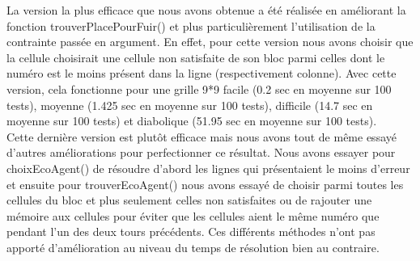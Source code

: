      La version la plus efficace que nous avons obtenue a été réalisée en améliorant la fonction trouverPlacePourFuir() et plus particulièrement l'utilisation de la contrainte passée en argument. En effet, pour cette version nous avons choisir que la cellule choisirait une cellule non satisfaite de son bloc parmi celles dont le numéro est le moins présent dans la ligne (respectivement colonne). Avec cette version, cela fonctionne pour une grille 9*9 facile (0.2 sec en moyenne sur 100 tests), moyenne (1.425 sec en moyenne sur 100 tests), difficile (14.7 sec en moyenne sur 100 tests) et diabolique (51.95 sec en moyenne sur 100 tests). \\
     
     Cette dernière version est plutôt efficace mais nous avons tout de même essayé d'autres améliorations pour perfectionner ce résultat. Nous avons essayer pour choixEcoAgent() de résoudre d'abord les lignes qui présentaient le moins d'erreur et ensuite pour trouverEcoAgent() nous avons essayé de choisir parmi toutes les cellules du bloc et plus seulement celles non satisfaites ou de rajouter une mémoire aux cellules pour éviter que les cellules aient le même numéro que pendant l'un des deux tours précédents. Ces différents méthodes n'ont pas apporté d'amélioration au niveau du temps de résolution bien au contraire. 